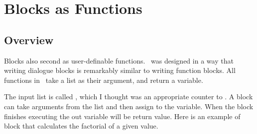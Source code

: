 \section{Blocks as Functions}

\subsection{Overview}

Blocks also second as user-definable functions.  \SSquared\ was designed in a way that writing dialogue blocks is remarkably similar to writing function blocks.  All functions in \SSquared\ take a list as their argument, and return a variable.

The input list is called , which I thought was an appropriate counter to .  A block can take arguments from the  list and then assign to the  variable.  When the block finishes executing the out variable will be return value.  Here is an example of block that calculates the factorial of a given value.

\begin{SSCodeBox}
\scitea{\{} \\
\scitea{\hspace*{4em}}
\scitea{ = }
\scitea{;} \\
\scitea{\hspace*{4em}} \\
\scitea{\hspace*{4em}}
\scitea{( in[}
\scitea{] $>$ }
\scitea{ )} \\
\scitel{\hspace*{4em}}
\scitea{\{} \\
\scitea{\hspace*{4em}\hspace*{4em}}
\scitea{ *= in[}
\scitea{];} \\
\scitea{\hspace*{4em}\hspace*{4em}in[}
\scitea{] -= }
\scitea{;} \\
\scitea{\hspace*{4em}\}} \\
\scitea{} \\
\scitea{\hspace*{4em}}
\scitea{=}
\scitea{;} \\
\scitea{\}}
\end{SSCodeBox}

